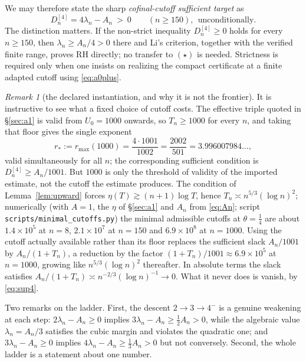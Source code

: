 \documentclass[11pt]{amsart}
\theoremstyle{definition}
\theoremstyle{remark}
\newtheorem{remark}[theorem]{Remark}
\theoremstyle{definition}
\begin{document}
We may therefore state the sharp \emph{cofinal-cutoff sufficient target} as
\begin{equation}\label{eq:target}
   \boxed{\ D_n^{[4]}=4\lambda_n-A_n\ >\ 0
   \qquad (n\ge150),\ \ \text{unconditionally.}\ }
\end{equation}
The distinction matters.  If the non-strict inequality $D_n^{[4]}\ge0$ holds for every
$n\ge150$, then $\lambda_n\ge A_n/4>0$ there and Li's criterion, together with the verified
finite range, proves RH directly; no transfer to $(\star)$ is needed.  Strictness is required
only when one insists on realizing the compact certificate at a finite adapted cutoff using
\eqref{eq:a0plus}.

\begin{remark}[the declared instantiation, and why it is not the frontier]\label{rmk:1000}
It is instructive to see what a fixed choice of cutoff costs. The effective triple quoted in
\S\ref{sec:a1} is valid from $U_0=1000$ onwards, so $T_n\ge1000$ for every $n$, and taking that
floor gives the single exponent
\begin{equation}\label{eq:rstar}
   r_*:=r_{\max}(1000)=\frac{4\cdot1001}{1002}=\frac{2002}{501}=3.996007984\ldots ,
\end{equation}
valid simultaneously for all $n$; the corresponding sufficient condition is
$D_n^{[4]}\ge A_n/1001$. But $1000$ is only the threshold of validity of the imported estimate,
not the cutoff the estimate produces. The condition of Lemma~\ref{lem:upward} forces
$\eta(T)\gtrsim(n+1)\log T$, hence $T_n\asymp n^{5/3}(\log n)^{2}$; numerically (with $A=1$, the
$\eta$ of \S\ref{sec:a1} and $A_n$ from \eqref{eq:An}; script \texttt{scripts/minimal\_cutoffs.py})
the minimal admissible cutoffs at $\theta=\tfrac14$ are about $1.4\times10^{5}$ at $n=8$,
$2.1\times10^{7}$ at $n=150$ and $6.9\times10^{8}$ at $n=1000$. Using the cutoff actually
available rather than its floor replaces the sufficient slack $A_n/1001$ by $A_n/(1+T_n)$, a
reduction by the factor $(1+T_n)/1001\approx6.9\times10^{5}$ at $n=1000$, growing like
$n^{5/3}(\log n)^2$ thereafter. In absolute terms the slack satisfies
$A_n/(1+T_n)\asymp n^{-2/3}(\log n)^{-1}\to0$. What it never
does is vanish, by \eqref{eq:sup4}.
\end{remark}

Two remarks on the ladder. First, the descent $2\to3\to4^-$ is a genuine weakening at each
step: $2\lambda_n-A_n\ge0$ implies $3\lambda_n-A_n\ge\tfrac12A_n>0$, while the algebraic value
$\lambda_n=A_n/3$ satisfies the cubic margin and violates the quadratic one; and
$3\lambda_n-A_n\ge0$ implies $4\lambda_n-A_n\ge\tfrac13A_n>0$ but not conversely. Second, the
whole ladder is a statement about one number.
\end{document}
